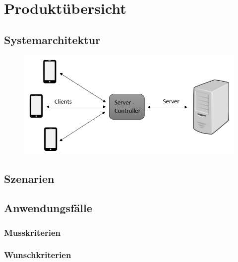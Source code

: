 \section{Produktübersicht}
\subsection{Systemarchitektur}

\begin{figure} [h]	
	\centering
	\includegraphics[scale = 0.8]{res/clientServerArchitektur.png}
\end{figure}



\subsection{Szenarien}
\subsection{Anwendungsfälle}
\subsubsection{Musskriterien}
\subsubsection{Wunschkriterien}